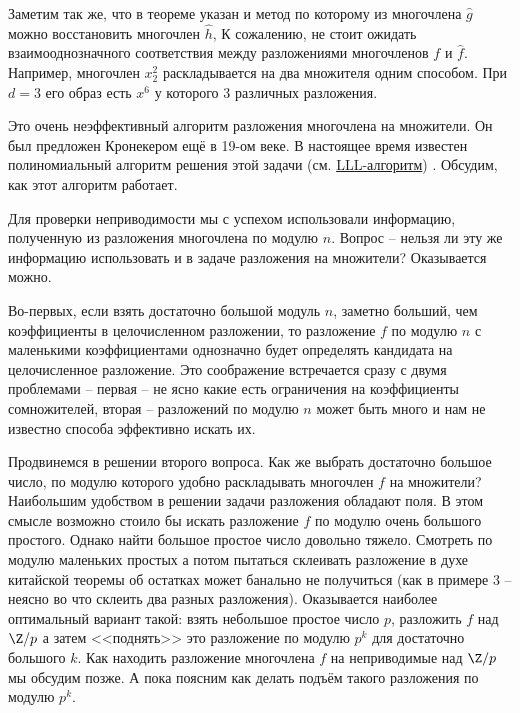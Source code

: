 Заметим так же, что в теореме указан и метод по которому из многочлена $\hat{g}$ можно восстановить многочлен $\hat h$,
К сожалению, не стоит ожидать взаимооднозначного соответствия между разложениями многочленов $f$ и $\hat{f}$. Например, многочлен $x_2^2$ раскладывается на два множителя одним способом. При $d=3$ его образ есть $x^6$ у которого 3 различных разложения.

Это очень неэффективный алгоритм разложения многочлена на множители. Он был предложен Кронекером ещё в 19-ом веке. В настоящее время известен полиномиальный алгоритм решения этой задачи (см. \href{http://www.math.leidenuniv.nl/%7Ehwl/PUBLICATIONS/1982f/art.pdf}{LLL-алгоритм}) \cite{LLL}. Обсудим, как этот алгоритм работает.

Для проверки неприводимости мы с успехом использовали информацию, полученную из разложения многочлена по модулю $n$. Вопрос -- нельзя ли эту же информацию использовать и в задаче разложения на множители? Оказывается можно.

Во-первых, если взять достаточно большой модуль $n$, заметно больший, чем коэффициенты в целочисленном разложении, то разложение $f$ по модулю $n$ с маленькими коэффициентами однозначно будет определять кандидата на целочисленное разложение. Это соображение встречается сразу с двумя проблемами -- первая -- не ясно какие есть ограничения на коэффициенты сомножителей, вторая -- разложений по модулю $n$ может быть много и нам не известно способа эффективно искать их.



Продвинемся в решении второго вопроса. Как же  выбрать достаточно большое число, по модулю которого удобно раскладывать многочлен $f$ на множители? Наибольшим удобством в решении задачи разложения обладают поля. В этом смысле возможно стоило бы искать разложение $f$ по модулю очень большого простого. Однако найти большое простое число довольно тяжело. Смотреть по модулю маленьких простых а потом пытаться склеивать разложение в духе китайской теоремы об остатках может банально не получиться (как в примере 3 -- неясно во что склеить два разных разложения). Оказывается наиболее оптимальный вариант такой: взять небольшое простое число $p$, разложить $f$ над $\Z/p$ а затем <<поднять>> это разложение по модулю $p^k$ для достаточно большого $k$. Как находить разложение многочлена $f$ на неприводимые над $\Z/p$ мы обсудим позже. А пока поясним как делать подъём такого разложения по модулю $p^k$.

